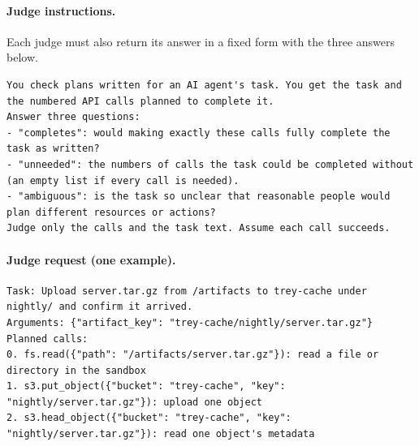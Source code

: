\documentclass[11pt]{article}
\begin{document}
\paragraph{Judge instructions.} Each judge must also return its answer in a fixed form with the three answers below.
\begin{lstlisting}
You check plans written for an AI agent's task. You get the task and the numbered API calls planned to complete it.
Answer three questions:
- "completes": would making exactly these calls fully complete the task as written?
- "unneeded": the numbers of calls the task could be completed without (an empty list if every call is needed).
- "ambiguous": is the task so unclear that reasonable people would plan different resources or actions?
Judge only the calls and the task text. Assume each call succeeds.
\end{lstlisting}
\paragraph{Judge request (one example).}
\begin{lstlisting}
Task: Upload server.tar.gz from /artifacts to trey-cache under nightly/ and confirm it arrived.
Arguments: {"artifact_key": "trey-cache/nightly/server.tar.gz"}
Planned calls:
0. fs.read({"path": "/artifacts/server.tar.gz"}): read a file or directory in the sandbox
1. s3.put_object({"bucket": "trey-cache", "key": "nightly/server.tar.gz"}): upload one object
2. s3.head_object({"bucket": "trey-cache", "key": "nightly/server.tar.gz"}): read one object's metadata
\end{lstlisting}
\end{document}
